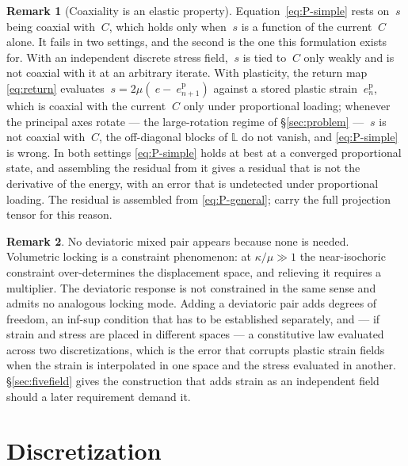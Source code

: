 \documentclass[11pt]{article}
\newcommand{\C}{~C}
\newcommand{\edev}{~e}
\newcommand{\sdev}{~s}
\theoremstyle{definition}
\newtheorem{remark}{Remark}
\theoremstyle{plain}
\begin{document}
\begin{remark}[Coaxiality is an elastic property]
\label{rem:coaxial}
Equation~\eqref{eq:P-simple} rests on $\sdev$ being coaxial with $\C$, which
holds only when $\sdev$ is a function of the current $\C$ alone. It fails in
two settings, and the second is the one this formulation exists for. With an
independent discrete stress field, $\sdev$ is tied to $\C$ only weakly and is
not coaxial with it at an arbitrary iterate. With plasticity, the return map
\eqref{eq:return} evaluates
$\sdev = 2\mu(\edev - \edev^{\mathrm p}_{n+1})$ against a stored
plastic strain $\edev^{\mathrm p}_n$, which is coaxial with the current $\C$
only under proportional loading; whenever the principal axes rotate ---
the large-rotation regime of \S\ref{sec:problem} --- $\sdev$ is not coaxial with $\C$, the
off-diagonal blocks of $\mathbb{L}$ do not vanish, and \eqref{eq:P-simple} is
wrong. In both settings \eqref{eq:P-simple} holds at best at a converged
proportional state, and assembling the residual from it gives a residual that
is not the derivative of the energy, with an error that is undetected under
proportional loading. The residual is assembled from \eqref{eq:P-general};
\citet{Miehe.Apel.Lambrecht:2002} carry the full projection tensor for this
reason.
\end{remark}

\begin{remark}
\label{rem:whynodev}
No deviatoric mixed pair appears because none is needed. Volumetric locking is
a constraint phenomenon: at $\kappa/\mu \gg 1$ the near-isochoric constraint
over-determines the displacement space, and relieving it requires a multiplier.
The deviatoric response is not constrained in the same sense and admits no
analogous locking mode. Adding a deviatoric pair adds degrees of freedom, an
inf-sup condition that has to be established separately, and --- if strain and
stress are placed in different spaces --- a constitutive law evaluated across
two discretizations, which is the error that corrupts plastic strain fields
when the strain is interpolated in one space and the stress evaluated in
another. \S\ref{sec:fivefield} gives the construction that adds strain as an
independent field should a later requirement demand it.
\end{remark}

\section{Discretization}
\label{sec:discretization}
\end{document}
